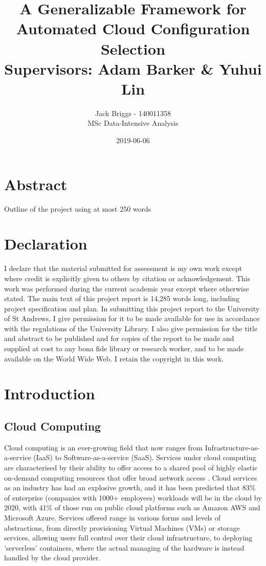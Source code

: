 \documentclass{report}
\title{\vspace{-2.0cm} A Generalizable Framework for Automated Cloud Configuration Selection \\ \vspace{0.5cm} \large Supervisors: Adam Barker \& Yuhui Lin}
\date{2019-06-06}
\author{Jack Briggs - 140011358 \\ MSc Data-Intensive Analysis}
\begin{document}
\maketitle
\newpage
\chapter*{Abstract}
Outline of the project using at most 250 words
\newpage
\chapter*{Declaration}
I declare that the material submitted for assessment
is my own work except where credit is explicitly
given to others by citation or acknowledgement. This
work was performed during the current academic year
except where otherwise stated.
The main text of this project report is 14,285 words
long, including project specification and plan.
In submitting this project report to the University of St
Andrews, I give permission for it to be made
available for use in accordance with the regulations of the University Library. I also give permission for the title and abstract to be published and for copies of the report to be made and supplied at cost to any bona fide library or research worker, and to be made available on the World Wide Web. I retain the copyright in this work.
\newpage
\tableofcontents
\listoffigures
\newpage
{}
\chapter{Introduction}
\section{Cloud Computing}
Cloud computing is an ever-growing field that now ranges from Infrastructure-as-a-service (IaaS) to Software-as-a-service (SaaS). Services under cloud computing are characterised by their ability to offer access to a shared pool of highly elastic on-demand computing resources that offer broad network access \cite{Pallis2010, Mell2011}. Cloud services as an industry has had an explosive growth, and it has been predicted that 83\% of enterprise (companies with 1000+ employees) workloads will be in the cloud by 2020\cite{Intricately2019}, with 41\% of those run on public cloud platforms such as Amazon AWS and Microsoft Azure. Services offered range in various forms and levels of abstractions, from directly provisioning Virtual Machines (VMs) or storage services, allowing users full control over their cloud infrastructure, to deploying 'serverless' containers, where the actual managing of the hardware is instead handled by the cloud provider.
\end{document}
